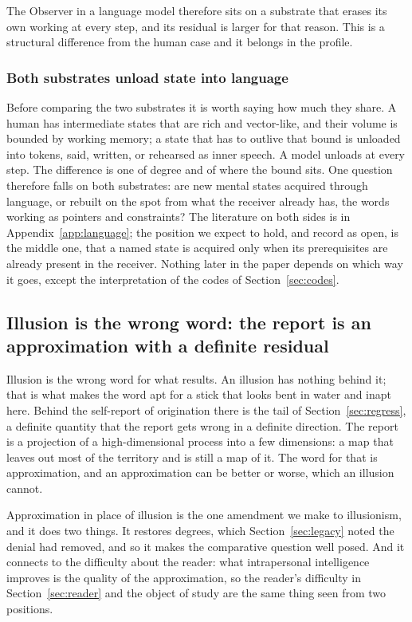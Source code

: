 The Observer in a language model therefore sits on a substrate that erases its own working at every
step, and its residual is larger for that reason. This is a structural difference from the human case
and it belongs in the profile.

\subsubsection{Both substrates unload state into language}
\label{sec:language}

Before comparing the two substrates it is worth saying how much they share. A human has intermediate
states that are rich and vector-like, and their volume is bounded by working memory; a state that has to
outlive that bound is unloaded into tokens, said, written, or rehearsed as inner speech. A model unloads
at every step. The difference is one of degree and of where the bound sits. One question therefore falls
on both substrates: are new mental states acquired through language, or rebuilt on the spot from what
the receiver already has, the words working as pointers and constraints? The literature on both sides
is in Appendix~\ref{app:language}; the position we expect to hold, and record as open, is the middle
one, that a named state is acquired only when its prerequisites are already present in the receiver.
Nothing later in the paper depends on which way it goes, except the interpretation of the codes of
Section~\ref{sec:codes}.

\subsection{Illusion is the wrong word: the report is an approximation with a definite residual}
\label{sec:approximation}

Illusion is the wrong word for what results. An illusion has nothing behind it; that is what makes the
word apt for a stick that looks bent in water and inapt here. Behind the self-report of origination
there is the tail of Section~\ref{sec:regress}, a definite quantity that the report gets wrong in a
definite direction. The report is a projection of a high-dimensional process into a few dimensions: a
map that leaves out most of the territory and is still a map of it. The word for that is approximation,
and an approximation can be better or worse, which an illusion cannot.

Approximation in place of illusion is the one amendment we make to illusionism, and it does two things. It restores degrees, which Section~\ref{sec:legacy} noted the denial had removed, and so it makes the comparative question well posed. And it connects to
the difficulty about the reader: what intrapersonal intelligence improves is the quality of the
approximation, so the reader's difficulty in Section~\ref{sec:reader} and the object of study are the same thing seen from
two positions.

